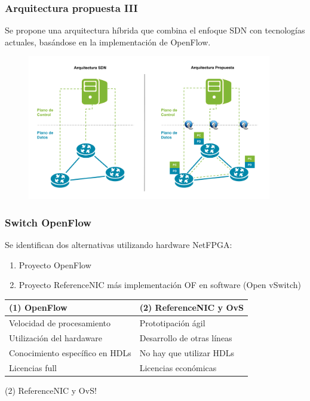 \documentclass{beamer}
\begin{document}
\begin{frame}
\frametitle{Arquitectura propuesta III} 

Se propone una arquitectura h\'ibrida que combina el enfoque SDN con tecnologías actuales, basándose 
en la implementaci\'on de OpenFlow.

\begin{figure}[H]
\centering
\includegraphics[width=0.95\textwidth, left]{imagenes/arquitecturapropuesta.png}
\end{figure}

\end{frame}


\begin{frame}
\frametitle{Switch OpenFlow} 

Se identifican dos alternativas utilizando hardware NetFPGA:
\pause 
\begin{enumerate}
\item Proyecto OpenFlow
\pause
\item Proyecto ReferenceNIC m\'as implementaci\'on OF en software (Open vSwitch)
\end{enumerate}

\pause
\begin{table}[]
\small
\centering
\label{label}
\begin{tabular}{| p{5cm} | p{5cm} |}

\hline
\multicolumn{1}{|l|}{(1) OpenFlow } & \multicolumn{1}{l|}{(2) ReferenceNIC y OvS } \\
\hline
Velocidad de procesamiento & Prototipaci\'on \'agil \\
Utilizaci\'on del hardaware &  Desarrollo de otras l\'ineas \\
Conocimiento espec\'ifico en HDLs &  No hay que utilizar HDLs \\
Licencias full &  Licencias econ\'omicas \\

\hline  
\end{tabular}
\end{table}

\pause
{\color{blue} (2) ReferenceNIC y OvS!}

\end{frame}
\end{document}
